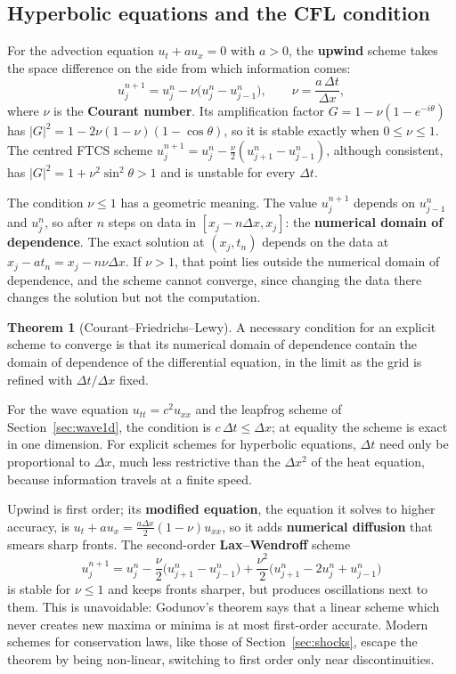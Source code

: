 \documentclass[11pt,a4paper]{article}
\numberwithin{equation}{section}
\theoremstyle{definition}
\newtheorem{thm}{Theorem}[subsection]
\begin{document}
\subsection{Hyperbolic equations and the CFL condition}
\label{ssec:cfl}

For the advection equation $u_t + au_x = 0$ with $a > 0$, the \textbf{upwind} scheme takes the space difference on the side from which information comes:
\[
u_j^{n + 1} = u_j^n - \nu\bigl(u_j^n - u_{j - 1}^n\bigr), \qquad \nu = \frac{a\,\Delta t}{\Delta x} ,
\]
where $\nu$ is the \textbf{Courant number}. Its amplification factor $G = 1 - \nu(1 - e^{-i\theta})$ has $|G|^2 = 1 - 2\nu(1 - \nu)(1 - \cos\theta)$, so it is stable exactly when $0 \leq \nu \leq 1$. The centred FTCS scheme $u_j^{n + 1} = u_j^n - \frac\nu2(u_{j + 1}^n - u_{j - 1}^n)$, although consistent, has
$|G|^2 = 1 + \nu^2\sin^2\theta > 1$ and is unstable for every $\Delta t$.

The condition $\nu \leq 1$ has a geometric meaning. The value $u_j^{n + 1}$ depends on $u_{j - 1}^n$ and $u_j^n$, so after $n$ steps on data in $[x_j - n\Delta x, x_j]$: the \textbf{numerical domain of dependence}. The exact solution at $(x_j, t_n)$ depends on the data at $x_j - at_n = x_j - n\nu\Delta x$.
If $\nu > 1$, that point lies outside the numerical domain of dependence, and the scheme cannot converge, since changing the data there changes the solution but not the computation.

\begin{thm}[Courant--Friedrichs--Lewy]
\label{thm:cfl}
A necessary condition for an explicit scheme to converge is that its numerical domain of dependence contain the domain of dependence of the differential equation, in the limit as the grid is refined with $\Delta t/\Delta x$ fixed.
\end{thm}

For the wave equation $u_{tt} = c^2u_{xx}$ and the leapfrog scheme of Section~\ref{sec:wave1d}, the condition is $c\,\Delta t \leq \Delta x$; at equality the scheme is exact in one dimension. For explicit schemes for hyperbolic equations, $\Delta t$ need only be proportional to $\Delta x$, much less restrictive than the
$\Delta x^2$ of the heat equation, because information travels at a finite speed.

Upwind is first order; its \textbf{modified equation}, the equation it solves to higher accuracy, is $u_t + au_x = \frac{a\Delta x}2(1 - \nu)u_{xx}$, so it adds \textbf{numerical diffusion} that smears sharp fronts. The second-order \textbf{Lax--Wendroff} scheme
\[
u_j^{n + 1} = u_j^n - \frac\nu2\bigl(u_{j + 1}^n - u_{j - 1}^n\bigr) + \frac{\nu^2}2\bigl(u_{j + 1}^n - 2u_j^n + u_{j - 1}^n\bigr)
\]
is stable for $\nu \leq 1$ and keeps fronts sharper, but produces oscillations next to them. This is unavoidable: Godunov's theorem says that a linear scheme which never creates new maxima or minima is at most first-order accurate. Modern schemes for conservation laws, like those of Section~\ref{sec:shocks}, escape the theorem by being
non-linear, switching to first order only near discontinuities.
\end{document}
